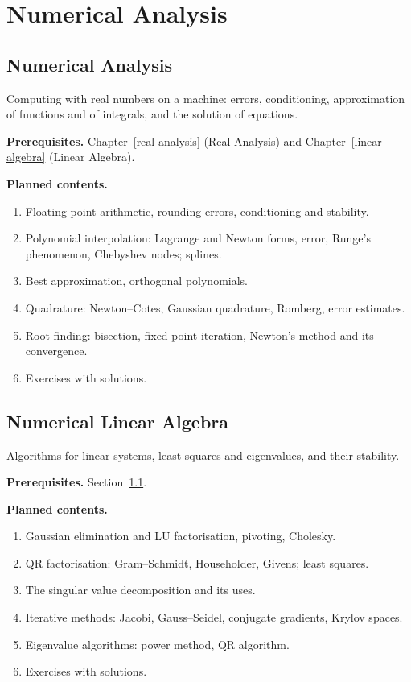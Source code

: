 \chapter{Numerical Analysis}\label{numerical-analysis}


\section{Numerical Analysis}\label{numerical-analysis:section-foundations}
Computing with real numbers on a machine: errors, conditioning, approximation of functions and of
integrals, and the solution of equations.

\noindent\textbf{Prerequisites.} Chapter~\ref{real-analysis} (Real Analysis) and Chapter~\ref{linear-algebra} (Linear Algebra).

\noindent\textbf{Planned contents.}
\begin{enumerate}
\item Floating point arithmetic, rounding errors, conditioning and stability.
\item Polynomial interpolation: Lagrange and Newton forms, error, Runge's phenomenon, Chebyshev nodes; splines.
\item Best approximation, orthogonal polynomials.
\item Quadrature: Newton--Cotes, Gaussian quadrature, Romberg, error estimates.
\item Root finding: bisection, fixed point iteration, Newton's method and its convergence.
\item Exercises with solutions.
\end{enumerate}

\section{Numerical Linear Algebra}\label{numerical-analysis:section-numerical-linear-algebra}
Algorithms for linear systems, least squares and eigenvalues, and their stability.

\noindent\textbf{Prerequisites.} Section~\ref{numerical-analysis:section-foundations}.

\noindent\textbf{Planned contents.}
\begin{enumerate}
\item Gaussian elimination and LU factorisation, pivoting, Cholesky.
\item QR factorisation: Gram--Schmidt, Householder, Givens; least squares.
\item The singular value decomposition and its uses.
\item Iterative methods: Jacobi, Gauss--Seidel, conjugate gradients, Krylov spaces.
\item Eigenvalue algorithms: power method, QR algorithm.
\item Exercises with solutions.
\end{enumerate}


